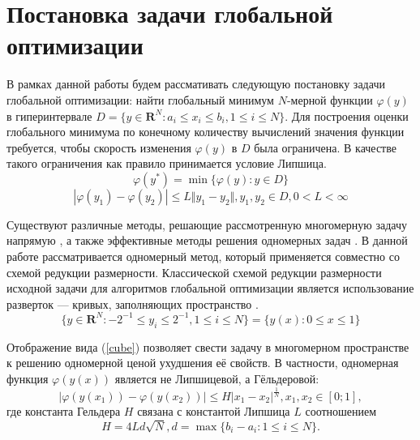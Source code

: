 \documentclass[11pt, oneside, a4paper]{article}
\begin{document}
\section{Постановка задачи глобальной оптимизации}
В рамках данной работы будем рассмативать следующую постановку задачи глобальной
оптимизации: найти глобальный минимум \(N\)-мерной функции \(\varphi(y)\) в гиперинтервале
\(D=\{y\in \mathbf{R}^N:a_i\leqslant x_i\leqslant{b_i}, 1\leqslant{i}\leqslant{N}\}\).
Для построения оценки глобального минимума по конечному количеству вычислений
значения функции требуется, чтобы скорость изменения \(\varphi(y)\) в \(D\) была ограничена.
В качестве такого ограничения как правило принимается условие Липшица.
\begin{equation}
\label{eq:task}
\varphi(y^*)=\min\{\varphi(y):y\in D\}
\end{equation}
\begin{displaymath}
\label{lip}
|\varphi(y_1)-\varphi(y_2)|\leqslant L\Vert y_1-y_2\Vert,y_1,y_2\in D,0<L<\infty
\end{displaymath}

Существуют различные методы, решающие рассмотренную многомерную задачу напрямую \cite{SergeyevKvasov2017, Jones2009},
а также эффективные методы решения одномерных задач \cite{Norkin1992, Strongin2000}. В данной работе рассматривается одномерный метод,
который применяется совместно со схемой редукции размерности.
Классической схемой редукции размерности исходной задачи для алгоритмов глобальной оптимизации является
использование разверток --- кривых, заполняющих пространство \cite{Sergeyev2013}.
\begin{equation}
\label{cube}
\lbrace y\in \mathbf{R}^N:-2^{-1}\leqslant y_i\leqslant 2^{-1},1\leqslant i\leqslant N\rbrace=\{y(x):0\leqslant x\leqslant 1\}
\end{equation}

Отображение вида (\ref{cube}) позволяет свести задачу в многомерном пространстве к решению
одномерной ценой ухудшения её свойств. В частности, одномерная функция \(\varphi(y(x))\)
является не Липшицевой, а Гёльдеровой:
\begin{displaymath}
\label{holder}
|\varphi(y(x_1))-\varphi(y(x_2))|\leqslant H{|x_1-x_2|}^{\frac{1}{N}},x_1,x_2\in[0;1],
\end{displaymath}
где константа Гельдера \(H\) связана с константой Липшица \(L\) соотношением
\begin{displaymath}
H=4Ld\sqrt{N},d=\max\{b_i-a_i:1\leqslant i\leqslant N\}.
\end{displaymath}
\end{document}
